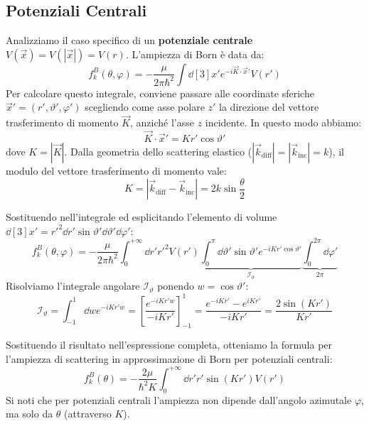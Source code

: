 
\subsection{Potenziali Centrali}


Analizziamo il caso specifico di un \textbf{potenziale centrale} \( V(\vec{x}) = V(|\vec{x}|) = V(r) \).
L'ampiezza di Born è data da:
\[
    f_k^B(\theta, \varphi) = -\frac{\mu}{2\pi\hbar^2} \int \dd[3]{x'} e^{-i \vec{K} \cdot \vec{x}'} V(r')
\]
Per calcolare questo integrale, conviene passare alle coordinate sferiche \( \vec{x}' = (r', \vartheta', \varphi') \) scegliendo come asse polare \( z' \) la direzione del vettore trasferimento di momento \( \vec{K} \), anziché l'asse \( z \) incidente.
In questo modo abbiamo:
\[
    \vec{K} \cdot \vec{x}' = K r' \cos\vartheta'
\]
dove \( K = |\vec{K}| \). Dalla geometria dello scattering elastico (\( |\vec{k}_{\text{diff}}| = |\vec{k}_{\text{inc}}| = k \)), il modulo del vettore trasferimento di momento vale:
\begin{equation}
    K = |\vec{k}_{\text{diff}} - \vec{k}_{\text{inc}}| = 2k \sin\frac{\theta}{2}
\end{equation}

Sostituendo nell'integrale ed esplicitando l'elemento di volume \( \dd[3]{x'} = r'^2 \dd{r'} \sin\vartheta' \dd{\vartheta'} \dd{\varphi'} \):
\[
    f_k^B(\theta, \varphi) = -\frac{\mu}{2\pi\hbar^2} \int_0^{+\infty} \dd{r'} r'^2 V(r') \underbrace{\int_0^{\pi} \dd{\vartheta'} \sin\vartheta' e^{-iKr'\cos\vartheta'}}_{\mathcal{I}_{\vartheta}} \underbrace{\int_0^{2\pi} \dd{\varphi'}}_{2\pi}
\]
Risolviamo l'integrale angolare \( \mathcal{I}_{\vartheta} \) ponendo \( w = \cos\vartheta' \):
\[
    \mathcal{I}_{\vartheta} = \int_{-1}^{1} \dd{w} e^{-iKr'w} = \left[ \frac{e^{-iKr'w}}{-iKr'} \right]_{-1}^{1} = \frac{e^{-iKr'} - e^{iKr'}}{-iKr'} = \frac{2\sin(Kr')}{Kr'}
\]

Sostituendo il risultato nell'espressione completa, otteniamo la formula per l'ampiezza di scattering in approssimazione di Born per potenziali centrali:
\begin{equation}
    f_k^B(\theta) = -\frac{2\mu}{\hbar^2 K} \int_0^{+\infty} \dd{r'} r' \sin(Kr') V(r')
\end{equation}
Si noti che per potenziali centrali l'ampiezza non dipende dall'angolo azimutale \( \varphi \), ma solo da \( \theta \) (attraverso \( K \)).

